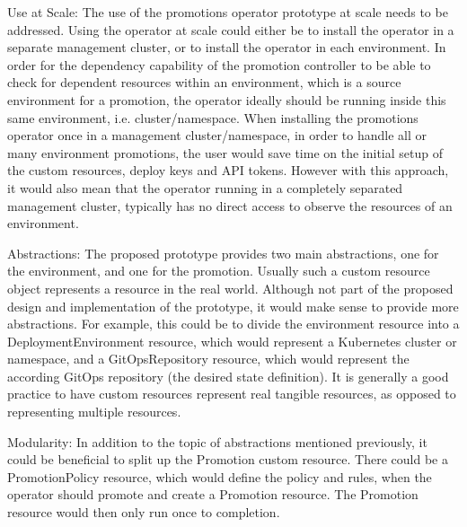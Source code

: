 Use at Scale:
The use of the promotions operator prototype at scale needs to be addressed.
Using the operator at scale could either be to install the operator in a separate management cluster,
or to install the operator in each environment.
In order for the dependency capability of the promotion controller
to be able to check for dependent resources within an environment,
which is a source environment for a promotion,
the operator ideally should be running inside this same environment, i.e. cluster/namespace.
%
When installing the promotions operator once in a management cluster/namespace,
in order to handle all or many environment promotions,
the user would save time on the initial setup of the custom resources, deploy keys and API tokens.
However with this approach, it would also mean that the operator running in a completely separated management cluster, typically has no direct access to observe the resources of an environment.

Abstractions:
The proposed prototype provides two main abstractions,
one for the environment,
and one for the promotion.
Usually such a custom resource object represents a resource in the real world.
Although not part of the proposed design and implementation of the prototype,
it would make sense to provide more abstractions.
For example, this could be to divide the environment resource into
a DeploymentEnvironment resource, which would represent a Kubernetes cluster or namespace,
and a GitOpsRepository resource, which would represent the according GitOps repository (the desired state definition).
It is generally a good practice to have custom resources represent real tangible resources,
as opposed to representing multiple resources.

Modularity:
In addition to the topic of abstractions mentioned previously,
it could be beneficial to split up the Promotion custom resource.
There could be a PromotionPolicy resource,
which would define the policy and rules,
when the operator should promote and create a Promotion resource.
The Promotion resource would then only run once to completion.

